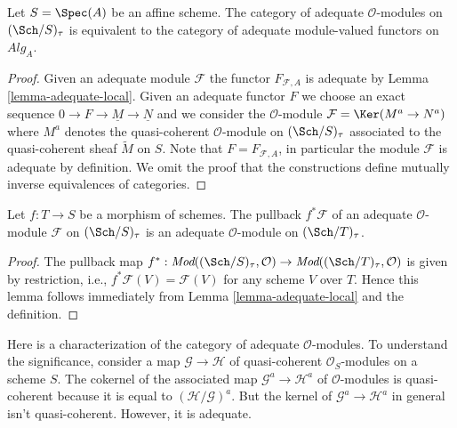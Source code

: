\begin{lemma}
\label{lemma-adequate-affine}
Let $S = \Spec(A)$ be an affine scheme. The category of adequate
$\mathcal{O}$-modules on $(\Sch/S)_\tau$ is equivalent to the
category of adequate module-valued functors on $\textit{Alg}_A$.
\end{lemma}

\begin{proof}
Given an adequate module $\mathcal{F}$ the functor $F_{\mathcal{F}, A}$
is adequate by Lemma \ref{lemma-adequate-local}.
Given an adequate functor $F$ we choose an exact sequence
$0 \to F \to \underline{M} \to \underline{N}$ and we consider
the $\mathcal{O}$-module $\mathcal{F} = \Ker(M^a \to N^a)$ where
$M^a$ denotes the quasi-coherent $\mathcal{O}$-module on
$(\Sch/S)_\tau$ associated to the quasi-coherent sheaf
$\widetilde{M}$ on $S$. Note that $F = F_{\mathcal{F}, A}$, in particular
the module $\mathcal{F}$ is adequate by definition.
We omit the proof that the constructions define mutually inverse
equivalences of categories.
\end{proof}

\begin{lemma}
\label{lemma-pullback-adequate}
Let $f : T \to S$ be a morphism of schemes.
The pullback $f^*\mathcal{F}$ of an adequate $\mathcal{O}$-module
$\mathcal{F}$ on $(\Sch/S)_\tau$ is an adequate
$\mathcal{O}$-module on $(\Sch/T)_\tau$.
\end{lemma}

\begin{proof}
The pullback map
$f^* : \textit{Mod}((\Sch/S)_\tau, \mathcal{O}) \to
\textit{Mod}((\Sch/T)_\tau, \mathcal{O})$
is given by restriction, i.e., $f^*\mathcal{F}(V) = \mathcal{F}(V)$
for any scheme $V$ over $T$. Hence this lemma follows immediately from
Lemma \ref{lemma-adequate-local}
and the definition.
\end{proof}

\noindent
Here is a characterization of the category of adequate $\mathcal{O}$-modules.
To understand the significance, consider a map $\mathcal{G} \to \mathcal{H}$
of quasi-coherent $\mathcal{O}_S$-modules on a scheme $S$.
The cokernel of the associated map $\mathcal{G}^a \to \mathcal{H}^a$
of $\mathcal{O}$-modules is quasi-coherent because it is equal to
$(\mathcal{H}/\mathcal{G})^a$. But the kernel of
$\mathcal{G}^a \to \mathcal{H}^a$ in general isn't
quasi-coherent. However, it is adequate.

